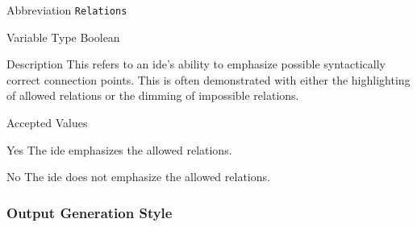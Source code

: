 \begin{AlignedDesc}
  \item[Abbreviation] \texttt{Relations}

  \item[Variable Type] Boolean

  \item[Description] This refers to an \ac{ide}'s ability to emphasize
  possible syntactically correct connection points. This is often
  demonstrated with either the highlighting of allowed relations or the
  dimming of impossible relations.

  \item[Accepted Values]

  \begin{AlignedDesc}
    \item[Yes] The \ac{ide} emphasizes the allowed relations.
    \item[No] The \ac{ide} does not emphasize the allowed relations.
  \end{AlignedDesc}

\end{AlignedDesc}

\subsubsection{Output Generation Style}
\label{subsubsec:output}

